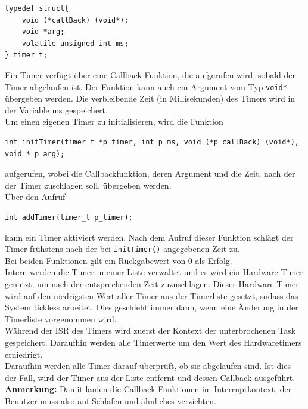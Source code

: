 \documentclass[fontsize=12pt, toc=bibliography, notitlepage]{scrreprt}
\begin{document}
\begin{lstlisting}[title=timer.h]
typedef struct{
	void (*callBack) (void*);
	void *arg;
	volatile unsigned int ms;
} timer_t;
\end{lstlisting}

Ein Timer verfügt über eine Callback Funktion, die aufgerufen wird, sobald der Timer abgelaufen ist. Der Funktion kann auch ein Argument vom Typ \lstinline$void*$ übergeben werden. Die verbleibende Zeit (in Millisekunden) des Timers wird in der Variable ms gespeichert.\\

Um einen eigenen Timer zu initialisieren, wird die Funktion

\begin{lstlisting}[title=timer.h]
int initTimer(timer_t *p_timer, int p_ms, void (*p_callBack) (void*), void * p_arg);
\end{lstlisting}

aufgerufen, wobei die Callbackfunktion, deren Argument und die Zeit, nach der der Timer zuschlagen soll, übergeben werden.\\
Über den Aufruf

\begin{lstlisting}[title=timer.h]
int addTimer(timer_t p_timer);
\end{lstlisting}

kann ein Timer aktiviert werden. Nach dem Aufruf dieser Funktion schlägt der Timer frühstens nach der bei \lstinline$initTimer()$ angegebenen Zeit zu.\\
Bei beiden Funktionen gilt ein Rückgabewert von 0 als Erfolg.\\
Intern werden die Timer in einer Liste verwaltet und es wird ein Hardware Timer genutzt, um nach der entsprechenden Zeit zuzuschlagen. Dieser Hardware Timer wird auf den niedrigsten Wert aller Timer aus der Timerliste gesetzt, sodass das System tickless arbeitet. Dies geschieht immer dann, wenn eine Änderung in der Timerliste vorgenommen wird.\\
Während der ISR des Timers wird zuerst der Kontext der unterbrochenen Task gespeichert. Daraufhin werden alle Timerwerte um den Wert des Hardwaretimers erniedrigt.\\
Daraufhin werden alle Timer darauf überprüft, ob sie abgelaufen sind. Ist dies der Fall, wird der Timer aus der Liste entfernt und dessen Callback ausgeführt.\\

\textbf{Anmerkung:} Damit laufen die Callback Funktionen im Interruptkontext, der Benutzer muss also auf Schlafen und ähnliches verzichten.
\end{document}
